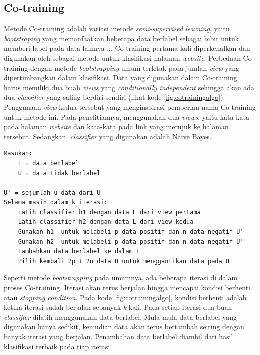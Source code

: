 	\subsection{Co-training}
	Metode Co-training adalah variasi metode \textit{semi-supervised learning}, yaitu \textit{bootstraping} yang memanfaatkan beberapa data berlabel sebagai bibit untuk memberi label pada data lainnya \citep{blummitchell};\citep{chapelle2006semi};\citep{blitzer2008semi}. Co-training pertama kali diperkenalkan dan digunakan oleh \cite{blummitchell} sebagai metode untuk klasifikasi halaman \textit{website}. Perbedaan Co-training dengan metode \textit{bootstrapping} umum terletak pada jumlah \textit{view} yang dipertimbangkan dalam klasifikasi. Data yang digunakan dalam Co-training harus memiliki dua buah \textit{views} yang \textit{conditionally independent} sehingga akan ada dua \textit{classifier} yang saling berdiri sendiri (lihat kode \ref{fig:cotrainingalgo}). Penggunaan \textit{view} kedua tersebut yang menginspirasi pemberian nama Co-training untuk metode ini. Pada penelitiannya, \cite{blummitchell} menggunakan dua \textit{views}, yaitu kata-kata pada halaman \textit{website} dan kata-kata pada link yang merujuk ke halaman tersebut. Sedangkan, \textit{classifier} yang digunakan adalah Naive Bayes.
	\begin{lstlisting}[caption={Algoritme Co-training pada penelitian \cite{blummitchell}}, label={fig:cotrainingalgo}]
Masukan:
	L = data berlabel 
	U = data tidak berlabel
	
U' = sejumlah u data dari U
Selama masih dalam k iterasi:
	Latih classifier h1 dengan data L dari view pertama
	Latih classifier h2 dengan data L dari view kedua
	Gunakan h1  untuk melabeli p data positif dan n data negatif U'
	Gunakan h2  untuk melabeli p data positif dan n data negatif U'
	Tambahkan data berlabel ke dalam L
	Pilih kembali 2p + 2n data U untuk menggantikan data pada U'
	\end{lstlisting}
	Seperti metode \textit{bootstrapping} pada umumnya,  ada beberapa iterasi di dalam proses Co-training. Iterasi akan terus berjalan hingga mencapai kondisi berhenti atau \textit{stopping condition}. Pada kode \ref{fig:cotrainingalgo}, kondisi berhenti adalah ketika iterasi sudah berjalan sebanyak \textit{k} kali. Pada setiap iterasi dua buah \textit{classifier} dilatih menggunakan data berlabel. Mula-mula data berlabel yang digunakan hanya sedikit, kemudian data akan terus bertambah seiring dengan banyak iterasi yang berjalan. Penambahan data berlabel diambil dari hasil klasifikasi terbaik pada tiap iterasi.

